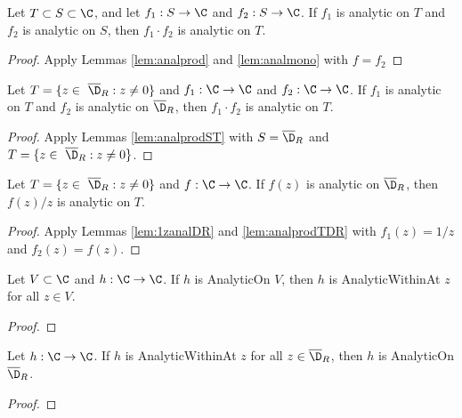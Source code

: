 \begin{lemma} \label{lem:analprodST} 
\leanok
Let $T\subset S\subset\C$, and let $f_1:S\to \C$ and $f_2:S\to \C$.
If $f_1$ is analytic on $T$ and $f_2$ is analytic on $S$, then $f_1\cdot f_2$ is analytic on $T$.
\end{lemma}
\begin{proof}
\leanok
{}
Apply Lemmas \ref{lem:analprod} and \ref{lem:analmono} with $f=f_2$
\end{proof}


\begin{lemma} \label{lem:analprodTDR} 
\leanok
Let $T=\{z\in\ \overline{\D}_R : z\neq0\}$ and $f_1:\C\to \C$ and $f_2:\C\to \C$.
If $f_1$ is analytic on $T$ and $f_2$ is analytic on $\overline{\D}_R$, then $f_1\cdot f_2$ is analytic on $T$.
\end{lemma}
\begin{proof}
\leanok
{}
Apply Lemmas \ref{lem:analprodST} with $S=\overline{\D}_R$ and $T=\{z\in\ \overline{\D}_R : z\neq0\}$.
\end{proof}

\begin{lemma} \label{lem:fzzTanal} 
\leanok
Let $T=\{z\in\ \overline{\D}_R : z\neq0\}$ and $f:\C\to \C$.
If $f(z)$ is analytic on $\overline{\D}_R$, then $f(z)/z$ is analytic on $T$.
\end{lemma}
\begin{proof}
\leanok
{}
Apply Lemmas \ref{lem:1zanalDR} and \ref{lem:analprodTDR} with $f_1(z) = 1/z$ and $f_2(z)=f(z)$.
\end{proof}


\begin{lemma} \label{lem:AnalOntoWithin} 
\leanok
Let $V\subset \C$ and $h:\C\to\C$. If $h$ is AnalyticOn $V$,
then $h$ is AnalyticWithinAt $z$ for all $z\in V$.
\end{lemma}
\begin{proof}
\leanok
\end{proof}

\begin{lemma} \label{lem:AnalWithintoOn} 
\leanok
Let $h:\C\to\C$. If $h$ is AnalyticWithinAt $z$ for all $z\in \overline{\D}_R$, then $h$ is AnalyticOn $\overline{\D}_R$.
\end{lemma}
\begin{proof}
\leanok
\end{proof}




